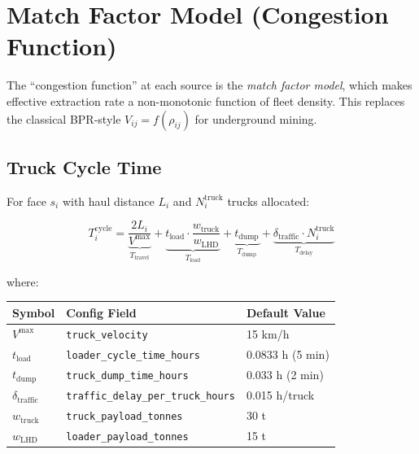 \documentclass[11pt,a4paper]{article}
\theoremstyle{definition}
\begin{document}
\section{Match Factor Model (Congestion Function)}
\label{sec:match-factor}

The ``congestion function'' at each source is the \emph{match factor model},
which makes effective extraction rate a non-monotonic function of fleet density.
This replaces the classical BPR-style $V_{ij} = f(\rho_{ij})$ for underground
mining.

\subsection{Truck Cycle Time}

For face $s_i$ with haul distance $L_i$ and $N_i^{\text{truck}}$ trucks allocated:

\begin{equation}
  T_i^{\text{cycle}} = \underbrace{\frac{2 L_i}{V^{\max}}}_{T_{\text{travel}}}
    + \underbrace{t_{\text{load}} \cdot \frac{w_{\text{truck}}}{w_{\text{LHD}}}}_{T_{\text{load}}}
    + \underbrace{t_{\text{dump}}}_{T_{\text{dump}}}
    + \underbrace{\delta_{\text{traffic}} \cdot N_i^{\text{truck}}}_{T_{\text{delay}}}
  \label{eq:cycle-time}
\end{equation}

where:
\begin{center}
\begin{tabular}{@{}lll@{}}
\toprule
\textbf{Symbol} & \textbf{Config Field} & \textbf{Default Value} \\
\midrule
$V^{\max}$ & \texttt{truck\_velocity} & 15 km/h \\
$t_{\text{load}}$ & \texttt{loader\_cycle\_time\_hours} & 0.0833 h (5 min) \\
$t_{\text{dump}}$ & \texttt{truck\_dump\_time\_hours} & 0.033 h (2 min) \\
$\delta_{\text{traffic}}$ & \texttt{traffic\_delay\_per\_truck\_hours} & 0.015 h/truck \\
$w_{\text{truck}}$ & \texttt{truck\_payload\_tonnes} & 30 t \\
$w_{\text{LHD}}$ & \texttt{loader\_payload\_tonnes} & 15 t \\
\bottomrule
\end{tabular}
\end{center}
\end{document}
